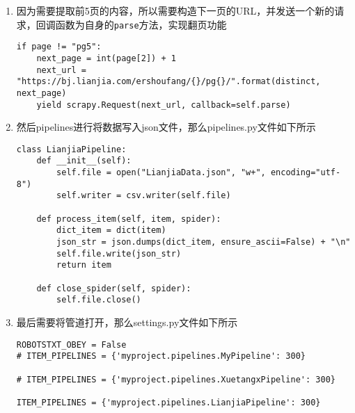\documentclass[lang=cn,11pt,a4paper]{elegantpaper}
\begin{document}
\begin{enumerate}
    在每个sellListContent类下面，每个li代表一个房子的信息。进行提取的代码如下
    \begin{lstlisting}
def parse(self, response):
    item = LianjiaItem()
    distinct = response.url.split("/")[4]
    page = response.url.split("/")[5]
    for each in response.xpath('//ul[@class="sellListContent"]/li'):
        item["name"] = "楼盘名称：" + each.xpath("div/div/a/text()").get()
        price_value = each.xpath(
            "div/div[@class='priceInfo']/div[@class='totalPrice totalPrice2']/span/text()"
        ).get()
        price_unit = each.xpath(
            "div/div[@class='priceInfo']/div[@class='totalPrice totalPrice2']/i[last()]/text()"
        ).get()
        item["price"] = "总价：" + f"{price_value}{price_unit}"
        area_text = each.xpath(
            ".//div[@class='address']/div[@class='houseInfo']/text()"
        ).get()
        match = re.search(r"(\d+(\.\d+)?)平米", area_text)
        if match:
            item["area"] = "平米数：" + match.group(1) + "平米"
        else:
            item["area"] = "平米数：" + "unknown"
        item["unit_price"] = "单价：" + each.xpath(
            "div/div[@class='priceInfo']/div[@class='unitPrice']/span/text()"
        ).get()
        if item["name"] and item["price"] and item["area"] and item["unit_price"]:
            yield item
    \end{lstlisting}
    为了便于提取平米数，使用了正则表达式re库
    \item 因为需要提取前5页的内容，所以需要构造下一页的URL，并发送一个新的请求，回调函数为自身的\lstinline{parse}方法，实现翻页功能
    \begin{lstlisting}
if page != "pg5":
    next_page = int(page[2]) + 1
    next_url = "https://bj.lianjia.com/ershoufang/{}/pg{}/".format(distinct, next_page)
    yield scrapy.Request(next_url, callback=self.parse)
    \end{lstlisting}
    \item 然后pipelines进行将数据写入json文件，那么pipelines.py文件如下所示
    \begin{lstlisting}
class LianjiaPipeline:
    def __init__(self):
        self.file = open("LianjiaData.json", "w+", encoding="utf-8")
        self.writer = csv.writer(self.file)

    def process_item(self, item, spider):
        dict_item = dict(item)
        json_str = json.dumps(dict_item, ensure_ascii=False) + "\n"
        self.file.write(json_str)
        return item

    def close_spider(self, spider):
        self.file.close()
    \end{lstlisting}
    \item 最后需要将管道打开，那么settings.py文件如下所示
    \begin{lstlisting}
ROBOTSTXT_OBEY = False
# ITEM_PIPELINES = {'myproject.pipelines.MyPipeline': 300}

# ITEM_PIPELINES = {'myproject.pipelines.XuetangxPipeline': 300}

ITEM_PIPELINES = {'myproject.pipelines.LianjiaPipeline': 300}
    \end{lstlisting}
\end{enumerate}
\end{document}
